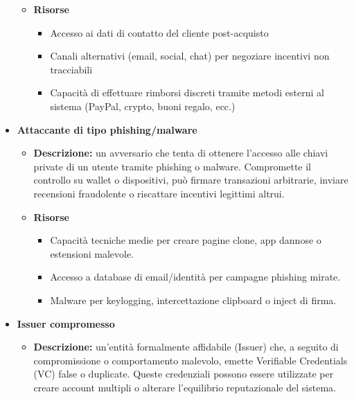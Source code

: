 \begin{itemize}
\begin{itemize}
                    \item \textbf{Risorse}
                        \begin{itemize}
                            \item Accesso ai dati di contatto del cliente post-acquisto
    
                            \item Canali alternativi (email, social, chat) per negoziare incentivi non tracciabili
        
                            \item Capacità di effettuare rimborsi discreti tramite metodi esterni al sistema (PayPal, crypto, buoni regalo, ecc.)
                        \end{itemize}
                \end{itemize}

            \item \textbf{Attaccante di tipo phishing/malware}
                \begin{itemize}
                    \item \textbf{Descrizione:} un avversario che tenta di ottenere l'accesso alle chiavi private di un utente tramite phishing o malware. Compromette il controllo su wallet o dispositivi, può firmare transazioni arbitrarie, inviare recensioni fraudolente o riscattare incentivi legittimi altrui.
                    
                    \item \textbf{Risorse}
                        \begin{itemize}
                            \item Capacità tecniche medie per creare pagine clone, app dannose o estensioni malevole.
                            
                            \item Accesso a database di email/identità per campagne phishing mirate.
                            
                            \item Malware per keylogging, intercettazione clipboard o inject di firma.
                        \end{itemize}
                \end{itemize}

            \item \textbf{Issuer compromesso}
                \begin{itemize}
                    \item \textbf{Descrizione:} un'entità formalmente affidabile (Issuer) che, a seguito di compromissione o comportamento malevolo, emette Verifiable Credentials (VC) false o duplicate. Queste credenziali possono essere utilizzate per creare account multipli o alterare l'equilibrio reputazionale del sistema.
                    

\end{itemize}
\end{itemize}
